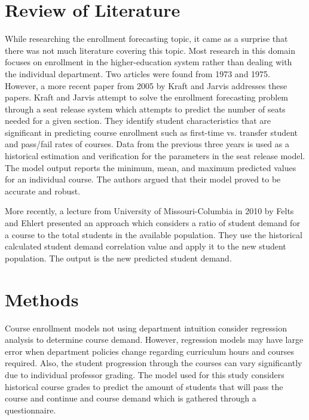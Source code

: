 \documentclass[12pt]{article}
\begin{document}
\section*{Review of Literature}
While researching the enrollment forecasting topic, it came as a surprise that there was not much literature 
covering this topic. Most research in this domain focuses on enrollment in the higher-education system 
rather than dealing with the individual department. Two articles were found from 1973 and 1975. However, 
a more recent paper from 2005 by Kraft and Jarvis \cite{kraft2005adaptive} addresses these papers. 
Kraft and Jarvis attempt to solve the enrollment forecasting problem through a seat release system which 
attempts to predict the number of seats needed for a given section. They identify student characteristics 
that are significant in predicting course enrollment such as first-time vs. transfer student and pass/fail rates 
of courses. Data from the previous three years is used as a historical estimation and verification for the 
parameters in the seat release model. The model output reports the minimum, mean, and maximum 
predicted values for an individual course. The authors argued that their model proved to be accurate and 
robust.

More recently, a lecture from University of Missouri-Columbia in 2010 by Felts and Ehlert \cite{LectureMU} 
presented an approach which considers a ratio of student demand for a course to the total students in the 
available population. They use the historical calculated student demand correlation value and apply it to the 
new student population. The output is the new predicted student demand. 


\section*{Methods}
Course enrollment models not using department intuition consider regression analysis to determine course 
demand. However, regression models may have large error when department policies change regarding 
curriculum hours and courses required. Also, the student progression through the courses can vary 
significantly due to individual professor grading. The model used for this study considers historical course 
grades to predict the amount of students that will pass the course and continue and course demand which
is gathered through a questionnaire.
\end{document}
